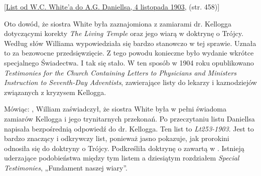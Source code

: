 [\href{https://ellenwhite.org/letterbooks/555}{List od W.C. White'a do A.G. Daniellsa, 4 listopada 1903,} (str. 458)]

Oto dowód, że siostra White była zaznajomiona z zamiarami dr. Kellogga dotyczącymi korekty \textit{The Living Temple} oraz jego wiarą w doktrynę o Trójcy. Według słów Williama wypowiedziała się bardzo stanowczo w tej sprawie. Uznała to za bezowocne przedsięwzięcie. Z tego powodu konieczne było wydanie wkrótce specjalnego Świadectwa. I tak się stało. W ten sposób w 1904 roku opublikowano \textit{Testimonies for the Church Containing Letters to Physicians and Ministers Instruction to Seventh-Day Adventists}, zawierające listy do lekarzy i kaznodziejów związanych z kryzysem Kellogga.

Mówiąc: , William zaświadczył, że siostra White była w pełni świadoma zamiarów Kellogga i jego trynitarnych przekonań. Po przeczytaniu listu Daniellsa napisała bezpośrednią odpowiedź do dr. Kellogga. Ten list to \textit{Lt253-1903}. Jest to bardzo znaczący i odkrywczy list, ponieważ jasno pokazuje, jak prorokini odnosiła się do doktryny o Trójcy. Podkreśliła doktrynę o  zawartą w . Istnieją uderzające podobieństwa między tym listem a dziesiątym rozdziałem \textit{Special Testimonies}, „Fundament naszej wiary”.


